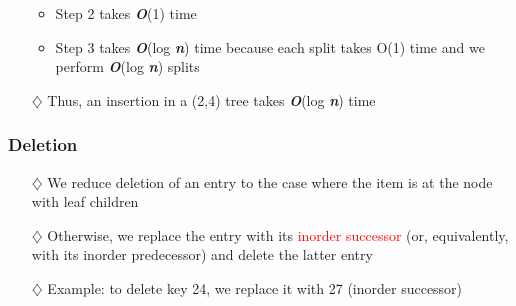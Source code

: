 \documentclass[pdf,
serif,
compress,
xcolor=table,
dvipsnames,
spanish,
aspectratio=169]{beamer}
\begin{document}
\begin{frame}
\begin{minipage}{0.5\linewidth}
\begin{itemize}
\begin{itemize}
                \item Step 2 takes \textbf{\textit{O}}(1) time
                \item Step 3 takes \textbf{\textit{O}}(log \textbf{\textit{n}}) time because each split takes O(1) time and we perform \textbf{\textit{O}}(log \textbf{\textit{n}}) splits
            \end{itemize}
            \item[\(\diamondsuit\)] Thus, an insertion in a (2,4) tree takes \textbf{\textit{O}}(log \textbf{\textit{n}}) time
        \end{itemize}
    \end{minipage}
\end{frame}

\begin{frame}
    \frametitle{Deletion}
    \begin{itemize} \color{purpura}
        \item[\(\diamondsuit\)] We reduce deletion of an entry to the case where the item is at the node with leaf children
        \item[\(\diamondsuit\)] Otherwise, we replace the entry with its \textcolor{Red}{inorder successor} (or, equivalently, with its inorder predecessor) and delete the latter entry
        \item[\(\diamondsuit\)] Example: to delete key 24, we replace it with 27 (inorder successor)
    \end{itemize}


\end{frame}
\end{document}
